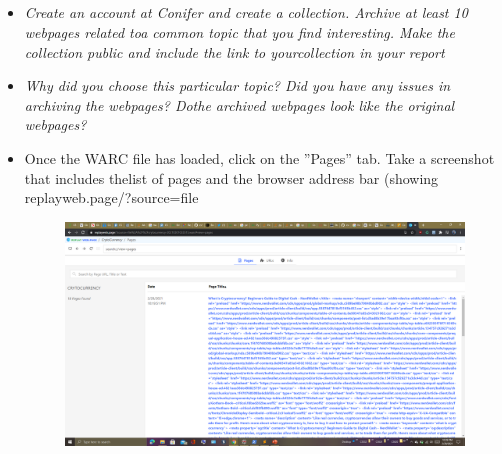 \documentclass[12pt]{article}
\begin{document}
\subsection*{\color{blue}{Answer}}
\begin{itemize}
    \item \emph{Create an account at Conifer and create a collection. Archive at least 10 webpages related toa common topic that you find interesting.  Make the collection public and include the link to yourcollection in your report}
    \item \emph{Why did you choose this particular topic? Did you have any issues in archiving the webpages? Dothe archived webpages look like the original webpages?}
    \item Once the WARC file has loaded, click on the ”Pages” tab.  Take a screenshot that includes thelist of pages and the browser address bar (showing replayweb.page/?source=file
        \begin{figure}[H]
                \centering
                \includegraphics[trim=0 0 0 0, clip, width=\textwidth] {upload.PNG}

\end{figure}
\end{itemize}
\end{document}
